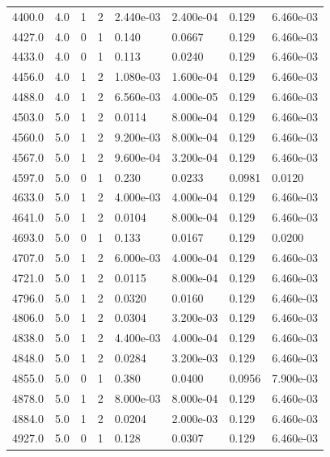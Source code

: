 \documentclass[preview]{standalone}
\begin{document}
{{{{{\begin{tabular}{L{1.2cm}C{1.2cm} C{0.3cm}C{0.5cm} C{1.4cm}C{1.4cm} C{1.4cm}C{1.4cm}}
  4400.0  &   4.0  & 1     &  2 &  2.440e-03  & 2.400e-04  & 0.129 &  6.460e-03   \\ 
  4427.0  &   4.0  & 0     &  1 &  0.140  & 0.0667  & 0.129 &  6.460e-03   \\ 
  4433.0  &   4.0  & 0     &  1 &  0.113  & 0.0240  & 0.129 &  6.460e-03   \\ 
  4456.0  &   4.0  & 1     &  2 &  1.080e-03  & 1.600e-04  & 0.129 &  6.460e-03   \\ 
  4488.0  &   4.0  & 1     &  2 &  6.560e-03  & 4.000e-05  & 0.129 &  6.460e-03   \\ 
  4503.0  &   5.0  & 1     &  2 &  0.0114  & 8.000e-04  & 0.129 &  6.460e-03   \\ 
  4560.0  &   5.0  & 1     &  2 &  9.200e-03  & 8.000e-04  & 0.129 &  6.460e-03   \\ 
  4567.0  &   5.0  & 1     &  2 &  9.600e-04  & 3.200e-04  & 0.129 &  6.460e-03   \\ 
  4597.0  &   5.0  & 0     &  1 &  0.230  & 0.0233  & 0.0981 &  0.0120   \\ 
  4633.0  &   5.0  & 1     &  2 &  4.000e-03  & 4.000e-04  & 0.129 &  6.460e-03   \\ 
  4641.0  &   5.0  & 1     &  2 &  0.0104  & 8.000e-04  & 0.129 &  6.460e-03   \\ 
  4693.0  &   5.0  & 0     &  1 &  0.133  & 0.0167  & 0.129 &  0.0200   \\ 
  4707.0  &   5.0  & 1     &  2 &  6.000e-03  & 4.000e-04  & 0.129 &  6.460e-03   \\ 
  4721.0  &   5.0  & 1     &  2 &  0.0115  & 8.000e-04  & 0.129 &  6.460e-03   \\ 
  4796.0  &   5.0  & 1     &  2 &  0.0320  & 0.0160  & 0.129 &  6.460e-03   \\ 
  4806.0  &   5.0  & 1     &  2 &  0.0304  & 3.200e-03  & 0.129 &  6.460e-03   \\ 
  4838.0  &   5.0  & 1     &  2 &  4.400e-03  & 4.000e-04  & 0.129 &  6.460e-03   \\ 
  4848.0  &   5.0  & 1     &  2 &  0.0284  & 3.200e-03  & 0.129 &  6.460e-03   \\ 
  4855.0  &   5.0  & 0     &  1 &  0.380  & 0.0400  & 0.0956 &  7.900e-03   \\ 
  4878.0  &   5.0  & 1     &  2 &  8.000e-03  & 8.000e-04  & 0.129 &  6.460e-03   \\ 
  4884.0  &   5.0  & 1     &  2 &  0.0204  & 2.000e-03  & 0.129 &  6.460e-03   \\ 
  4927.0  &   5.0  & 0     &  1 &  0.128  & 0.0307  & 0.129 &  6.460e-03   \\ 

\end{tabular}}}}}}
\end{document}
